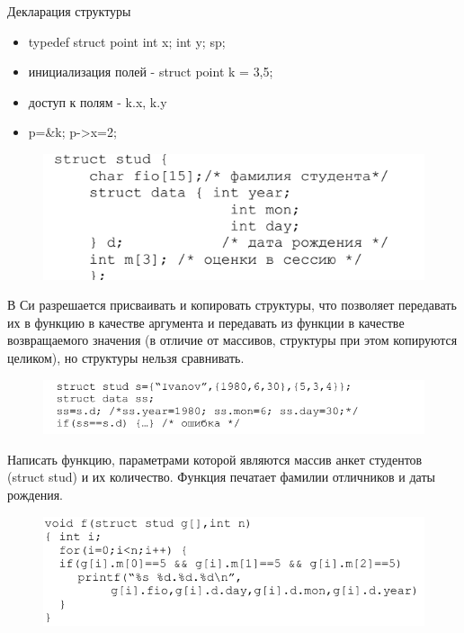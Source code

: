 \documentclass{beamer}
\begin{document}
\begin{frame}{Декларация структуры}
\begin{itemize}
\item typedef struct point { int x; int y; } sp;
\item инициализация полей - struct point k = {3,5};
\item доступ к полям - k.x, k.y
\item p=\&k; p->x=2;
\end{itemize}
\begin{figure}[h]
\centering
\includegraphics[scale=0.6]{images/lec04-pic07.png}
\end{figure}
\end{frame}

\begin{frame}
В Си разрешается присваивать и копировать структуры, что позволяет передавать их в функцию в качестве аргумента и передавать из функции в качестве возвращаемого значения (в отличие от массивов, структуры при этом копируются целиком), но структуры нельзя сравнивать. 
\begin{figure}[h]
\centering
\includegraphics[scale=0.6]{images/lec04-pic08.png}
\end{figure}
\end{frame}

\begin{frame}
Написать функцию, параметрами которой являются массив анкет студентов (struct stud) и их количество. Функция печатает фамилии отличников и даты рождения.
\begin{figure}[h]
\centering
\includegraphics[scale=0.6]{images/lec04-pic09.png}
\end{figure}
\end{frame}
\end{document}
